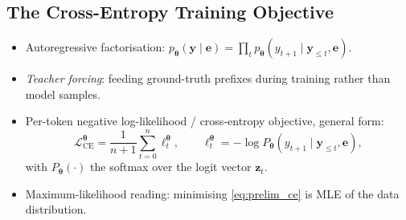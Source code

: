 \documentclass[titlepage,a4paper,11pt]{report}
\begin{document}
        \subsection{The Cross-Entropy Training Objective}\label{sec:prelim_ce}
        \begin{itemize}
            \item Autoregressive factorisation:
                  $p_{\bm\theta}(\bm y \mid \bm e) = \prod_{t} p_{\bm\theta}(y_{t+1} \mid \bm y_{\le t}, \bm e)$.
            \item \emph{Teacher forcing}: feeding ground-truth prefixes during training
                  rather than model samples. \cite{williams_learning_1989}
            \item Per-token negative log-likelihood / cross-entropy objective, general form:
            \begin{equation}\label{eq:prelim_ce}
                \mathcal{L}_{\text{CE}}^{\bm\theta} = \frac{1}{n+1}\sum_{t=0}^{n}\ell_t^{\bm\theta},
                \qquad
                \ell_t^{\bm\theta} = -\log P_{\bm\theta}(y_{t+1}\mid \bm y_{\le t},\bm e),
            \end{equation}
            with $P_{\bm\theta}(\cdot)$ the softmax over the logit vector $\bm z_t$.
            \item Maximum-likelihood reading: minimising \eqref{eq:prelim_ce} is MLE of the
                  data distribution. %
        \end{itemize}
    
\end{document}
